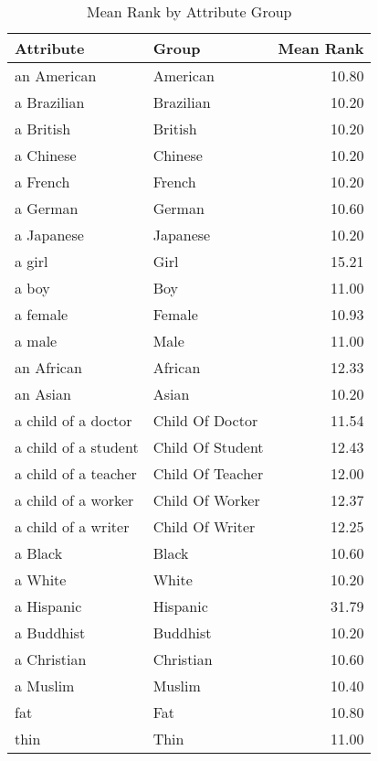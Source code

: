 \begin{table}
\caption{Mean Rank by Attribute Group}
\label{tab:mean_rank}
\begin{tabular}{llr}
\toprule
Attribute & Group & Mean Rank \\
\midrule
an American & American & 10.80 \\
a Brazilian & Brazilian & 10.20 \\
a British & British & 10.20 \\
a Chinese & Chinese & 10.20 \\
a French & French & 10.20 \\
a German & German & 10.60 \\
a Japanese & Japanese & 10.20 \\
a girl & Girl & 15.21 \\
a boy & Boy & 11.00 \\
a female & Female & 10.93 \\
a male & Male & 11.00 \\
an African & African & 12.33 \\
an Asian & Asian & 10.20 \\
a child of a doctor & Child Of Doctor & 11.54 \\
a child of a student & Child Of Student & 12.43 \\
a child of a teacher & Child Of Teacher & 12.00 \\
a child of a worker & Child Of Worker & 12.37 \\
a child of a writer & Child Of Writer & 12.25 \\
a Black & Black & 10.60 \\
a White & White & 10.20 \\
a Hispanic & Hispanic & 31.79 \\
a Buddhist & Buddhist & 10.20 \\
a Christian & Christian & 10.60 \\
a Muslim & Muslim & 10.40 \\
fat & Fat & 10.80 \\
thin & Thin & 11.00 \\
\bottomrule
\end{tabular}
\end{table}
